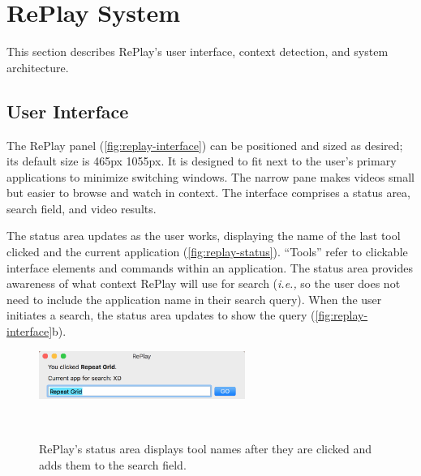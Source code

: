 \section{RePlay System}
This section describes RePlay's user interface, context detection, and system architecture.

\subsection{User Interface}
The RePlay panel (\autoref{fig:replay-interface}) can be positioned and sized as desired; its default size is 465px \texttimes 1055px. It is designed to fit next to the user's primary applications to minimize switching windows. The narrow pane makes videos small but easier to browse and watch in context. The interface comprises a status area, search field, and video results.

The status area updates as the user works, displaying the name of the last tool clicked and the current application (\autoref{fig:replay-status}). ``Tools'' refer to clickable interface elements and commands within an application. The status area provides awareness of what context RePlay will use for search (\textit{i.e.,} so the user does not need to include the application name in their search query). When the user initiates a search, the status area updates to show the query (\autoref{fig:replay-interface}b).

\begin{figure}[b!]
\centering
  \includegraphics[width=0.6\textwidth]{replay/figures/replay_status.png}
  \caption{RePlay's status area displays tool names after they are clicked and adds them to the search field. }~\label{fig:replay-status}
\end{figure}

